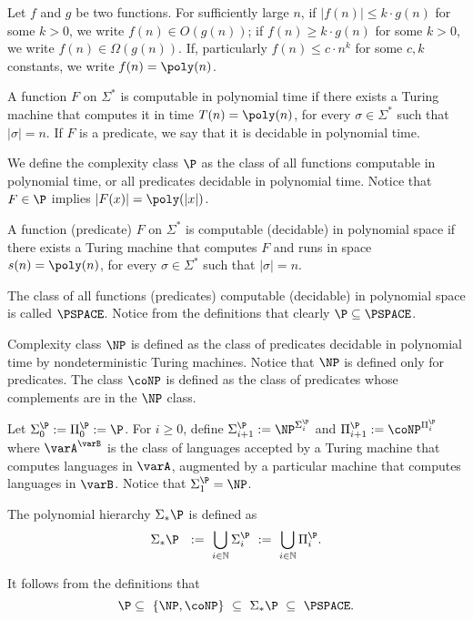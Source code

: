 Let $f$ and $g$ be two functions. For sufficiently large $n$, if $|f(n)|\leq k\cdot g(n)$ for some $k>0$, we write $f(n)\in O(g(n))$; if $f(n)\geq k\cdot g(n)$ for some $k>0$, we write $f(n)\in \Omega (g(n))$. If, particularly $f(n)\leq c\cdot n^k$ for some $c,k$ constants, we write $f(n)= \poly(n)$.

A function $F$ on $\Sigma^{\ast}$ is computable in polynomial time if there exists a Turing machine that computes it in time $T(n) =\poly(n)$, for every $\sigma\in \Sigma^{\ast}$ such that $|\sigma| = n$. If $F$ is a predicate, we say that it is decidable in polynomial time.

We define the complexity class $\P$ as the class of all functions computable in polynomial time, or all predicates decidable in polynomial time. Notice that $F\in\P$ implies $|F(x)| =\poly(|x|)$.

A function (predicate) $F$ on $\Sigma^{\ast}$ is computable (decidable) in polynomial space if there exists a Turing machine that computes $F$ and runs in space $s(n) =\poly(n)$, for every $\sigma\in \Sigma^{\ast}$ such that $|\sigma| = n$.

The class of all functions (predicates) computable (decidable) in polynomial space is called $\PSPACE$. Notice from the definitions that clearly $\P\subseteq\PSPACE$. 

Complexity class $\NP$ is defined as the class of predicates decidable in polynomial time by nondeterministic Turing machines. Notice that $\NP$ is defined only for predicates. The class $\coNP$ is defined as the class of predicates whose complements are in the $\NP$ class. 

Let $\Sigma_{0}^{\P} := \Pi_{0}^{\P} := \P$. For $i\geq 0$, define $\Sigma_{i+1}^{\P} := \NP^{\Sigma_{i}^{\P}}$ and $\Pi_{i+1}^{\P} :=\coNP^{\Pi_{i}^{\P}}$ where $\varA^{\varB}$ is the class of languages accepted by a Turing machine that computes languages in $\varA$, augmented by a particular machine that computes languages in $\varB$. Notice that  $\Sigma_{1}^{\P} = \NP$.

The polynomial hierarchy $\Sigma_{\ast}\P$ is defined as
\begin{equation*}
\Sigma_{\ast}\P\ \ :=\ \bigcup_{i\in\mathbb{N}} \Sigma_{i}^{\P}\ :=\ \bigcup_{i\in\mathbb{N}} \Pi_{i}^{\P}.
\end{equation*}


\begin{conj}
It follows from the definitions that
\begin{equation*}
\P \subseteq\ \{\NP, \coNP \}\ \subseteq\ \Sigma_{\ast}\P\ \subseteq\ \PSPACE.
\end{equation*}
\end{conj}

